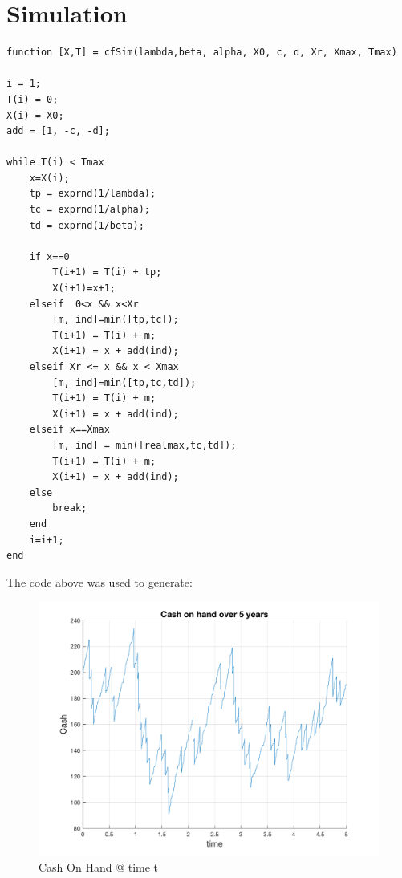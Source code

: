 \documentclass[]{article}
\begin{document}
\section{Simulation}
\begin{lstlisting}
function [X,T] = cfSim(lambda,beta, alpha, X0, c, d, Xr, Xmax, Tmax)

i = 1;
T(i) = 0;
X(i) = X0;
add = [1, -c, -d];

while T(i) < Tmax
	x=X(i);
	tp = exprnd(1/lambda);
	tc = exprnd(1/alpha);
	td = exprnd(1/beta);
	
	if x==0
		T(i+1) = T(i) + tp;
		X(i+1)=x+1;
	elseif  0<x && x<Xr
		[m, ind]=min([tp,tc]);
		T(i+1) = T(i) + m;
		X(i+1) = x + add(ind);
	elseif Xr <= x && x < Xmax
		[m, ind]=min([tp,tc,td]);
		T(i+1) = T(i) + m;
		X(i+1) = x + add(ind);
	elseif x==Xmax
		[m, ind] = min([realmax,tc,td]);
		T(i+1) = T(i) + m;
		X(i+1) = x + add(ind);
	else
		break;
	end
	i=i+1;
end
\end{lstlisting}

The code above was used to generate:

\begin{figure}[ht]
	\centering
	\includegraphics[width=0.7\linewidth]{figures/Cashflow}
	\caption{Cash On Hand @ time t}
	\label{fig:cashflow}
\end{figure}
\end{document}
